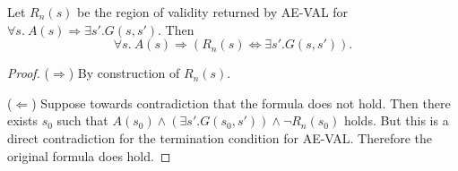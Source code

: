 

\begin{lemma}\label{lem:aeval}
  Let $R_n(s)$ be the region of validity returned by AE-VAL for $\forall
  s.~ A(s) \Rightarrow \exists s'. G(s, s')$. Then
  \begin{equation*}
  \forall s.~ A(s) \Rightarrow (R_n(s) \Leftrightarrow \exists s'. G(s, s')).
  \end{equation*}
\end{lemma}
\begin{proof}
  ($\Rightarrow$) By construction of $R_n(s)$.

  ($\Leftarrow$) Suppose towards contradiction that the formula does
  not hold. Then there exists $s_0$ such that $A(s_0) \land (\exists
  s'. G(s_0, s')) \land \neg R_n(s_0)$ holds. But this is a direct
  contradiction for the termination condition for AE-VAL. Therefore
  the original formula does hold.
\end{proof}



